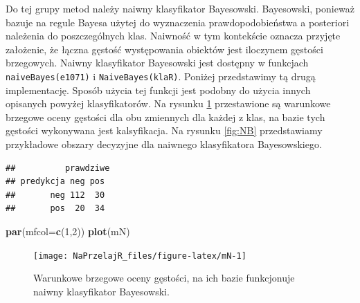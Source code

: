 \documentclass[polish,]{book}
\newenvironment{Shaded}{\begin{snugshade}}{\end{snugshade}}
\newcommand{\CommentTok}[1]{\textcolor[rgb]{0.56,0.35,0.01}{\textit{#1}}}
\newcommand{\DataTypeTok}[1]{\textcolor[rgb]{0.13,0.29,0.53}{#1}}
\newcommand{\DecValTok}[1]{\textcolor[rgb]{0.00,0.00,0.81}{#1}}
\newcommand{\KeywordTok}[1]{\textcolor[rgb]{0.13,0.29,0.53}{\textbf{#1}}}
\newcommand{\NormalTok}[1]{#1}
\newcommand{\OperatorTok}[1]{\textcolor[rgb]{0.81,0.36,0.00}{\textbf{#1}}}
\newcommand{\StringTok}[1]{\textcolor[rgb]{0.31,0.60,0.02}{#1}}
\begin{document}
Do tej grupy metod należy naiwny klasyfikator Bayesowski. Bayesowski, ponieważ bazuje na regule Bayesa użytej do wyznaczenia prawdopodobieństwa a posteriori
należenia do poszczególnych klas. Naiwność w tym kontekście oznacza przyjęte założenie, że łączna gęstość występowania obiektów jest iloczynem gęstości brzegowych.
Naiwny klasyfikator Bayesowski jest dostępny w funkcjach \texttt{naiveBayes(e1071)} i \texttt{NaiveBayes(klaR)}.
Poniżej przedstawimy tą drugą implementację.
Sposób użycia tej funkcji jest podobny do użycia innych opisanych powyżej klasyfikatorów. Na rysunku \ref{fig:mN} przestawione są warunkowe brzegowe oceny gęstości dla
obu zmiennych dla każdej z klas, na bazie tych gęstości wykonywana jest kalsyfikacja. Na rysunku \ref{fig:NB} przedstawiamy przykładowe obszary decyzyjne dla naiwnego klasyfikatora Bayesowskiego.

\begin{Shaded}
\end{Shaded}

\begin{verbatim}
##          prawdziwe
## predykcja neg pos
##       neg 112  30
##       pos  20  34
\end{verbatim}

\begin{Shaded}
\begin{Highlighting}[]
\KeywordTok{par}\NormalTok{(}\DataTypeTok{mfcol=}\KeywordTok{c}\NormalTok{(}\DecValTok{1}\NormalTok{,}\DecValTok{2}\NormalTok{))}
\KeywordTok{plot}\NormalTok{(mN)}
\end{Highlighting}
\end{Shaded}

\begin{figure}[h]

{\centering \texttt{[image: NaPrzelajR\_files/figure-latex/mN-1]} 

}

\caption{Warunkowe brzegowe oceny gęstości, na ich bazie funkcjonuje naiwny klasyfikator Bayesowski.}\label{fig:mN}
\end{figure}
\end{document}
